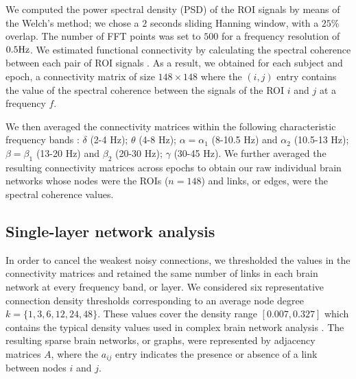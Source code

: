 We computed the power spectral density (PSD) of the ROI signals by means of the Welch's method; we chose a $2$ seconds sliding Hanning window, with a $25\%$ overlap. The number of FFT points was set to $500$ for a frequency resolution of $0.5 \text{Hz}$.
We estimated functional connectivity by calculating the spectral coherence between each pair of ROI signals \citep{carter_coherence_1987}. 
As a result, we obtained for each subject and epoch, a connectivity matrix of size $148 \times 148$ where the $(i,j)$ entry contains the value of the spectral coherence between the signals of the ROI $i$ and $j$ at a frequency $f$.

We then averaged the connectivity matrices within the following characteristic frequency bands \citep{stam_generalized_2002,babiloni_abnormal_2004}: $\delta$ (2-4 Hz); $\theta$ (4-8 Hz); $\alpha=\alpha_{1}$ (8-10.5 Hz) and $\alpha_{2}$ (10.5-13 Hz); $\beta=\beta_{1}$ (13-20 Hz) and $\beta_{2}$ (20-30 Hz); $\gamma$ (30-45 Hz).
We further averaged the resulting connectivity matrices across epochs to obtain our raw individual brain networks whose nodes were the ROIs ($n = 148$) and links, or edges, were the spectral coherence values.

\subsection{Single-layer network analysis} \label{subsec:singlelayer}

In order to cancel the weakest noisy connections, we thresholded the values in the connectivity matrices and retained the same number of links in each brain network at every frequency band, or layer.
We considered six representative connection density thresholds corresponding to an average node degree $k=\{1, 3, 6, 12, 24, 48\}$. These values cover the density range $[0.007, 0.327]$ which contains the typical density values used in complex brain network analysis \citep{bullmore_complex_2009,rubinov_complex_2010,de_vico_fallani_graph_2014}.
The resulting sparse brain networks, or graphs,  were represented by adjacency matrices $A$, where the $a_{ij}$ entry indicates the presence or absence of a link between nodes $i$ and $j$.

